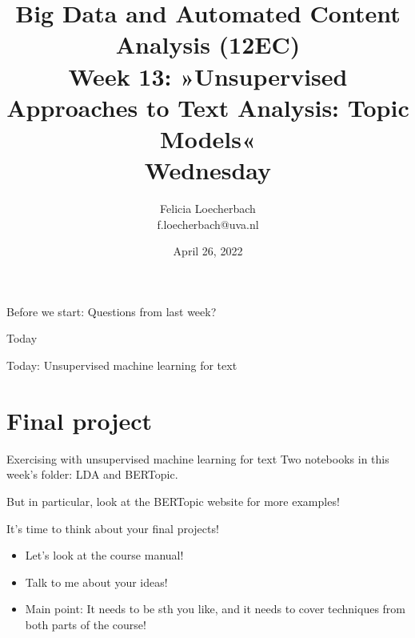 \documentclass[compress]{beamer}
\begin{document}
\title[Big Data and Automated Content Analysis]{\textbf{Big Data and Automated Content Analysis (12EC)} 
\\Week 13: »Unsupervised Approaches to Text Analysis: Topic Models«
\\Wednesday}
\author[Felicia Loecherbach]{Felicia Loecherbach\\ \footnotesize{f.loecherbach@uva.nl \\}}
\date{April 26, 2022}


\begin{frame}{}
	\titlepage
\end{frame}

\begin{frame}[standout]
Before we start: Questions from last week?
\end{frame}



\begin{frame}{Today}
	\tableofcontents
\end{frame}

\begin{frame}[standout]
Today: Unsupervised machine learning for text
\end{frame}









\section{Final project}
\begin{frame}{Exercising with unsupervised machine learning for text}
Two notebooks in this week's folder: LDA and BERTopic.

But in particular, look at the BERTopic website for more examples!
\end{frame}


\begin{frame}{It's time to think about your final projects!}
\begin{itemize}
\item Let's look at the course manual!
\item Talk to me about your ideas!
\item Main point: It needs to be sth you like, and it needs to cover techniques from both parts of the course!
\end{itemize}
\end{frame}




\begin{frame}
	\printbibliography
\end{frame}
\end{document}
